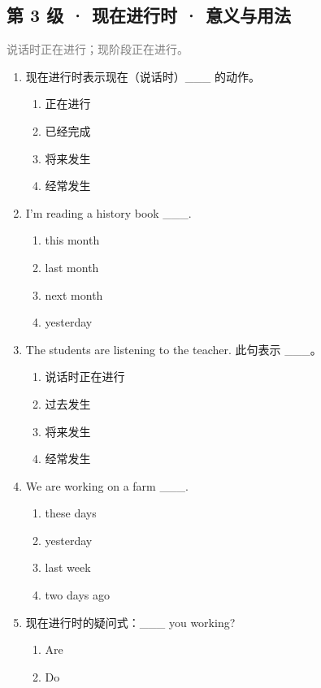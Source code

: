 \documentclass[11pt,a4paper]{ctexart}
\begin{document}
\subsection*{第 3 级 · 现在进行时 · 意义与用法}
\noindent\textcolor{gray}{说话时正在进行；现阶段正在进行。}\par\smallskip
\begin{enumerate}[leftmargin=*,itemsep=4pt]
\item 现在进行时表示现在（说话时）\_\_\_ 的动作。
\begin{enumerate}[label=\Alph*.,leftmargin=2em,itemsep=1pt,topsep=2pt]
\item 正在进行
\item 已经完成
\item 将来发生
\item 经常发生
\end{enumerate}
\item I’m reading a history book \_\_\_.
\begin{enumerate}[label=\Alph*.,leftmargin=2em,itemsep=1pt,topsep=2pt]
\item this month
\item last month
\item next month
\item yesterday
\end{enumerate}
\item The students are listening to the teacher. 此句表示 \_\_\_。
\begin{enumerate}[label=\Alph*.,leftmargin=2em,itemsep=1pt,topsep=2pt]
\item 说话时正在进行
\item 过去发生
\item 将来发生
\item 经常发生
\end{enumerate}
\item We are working on a farm \_\_\_.
\begin{enumerate}[label=\Alph*.,leftmargin=2em,itemsep=1pt,topsep=2pt]
\item these days
\item yesterday
\item last week
\item two days ago
\end{enumerate}
\item 现在进行时的疑问式：\_\_\_ you working?
\begin{enumerate}[label=\Alph*.,leftmargin=2em,itemsep=1pt,topsep=2pt]
\item Are
\item Do

\end{enumerate}
\end{enumerate}
\end{document}
